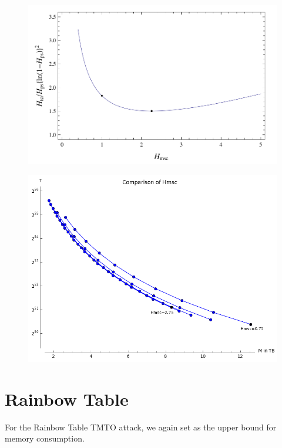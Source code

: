 \begin{figure}[H]
  \centering
  \begin{minipage}{0.45\textwidth}
    \centering
    \includegraphics[width=1.2\textwidth]{figures/HellmanTradeOff.png}
    \label{fig:dpTC}
  \end{minipage}\hfill
  \begin{minipage}{0.45\textwidth}
    \centering
    \includegraphics[width=1.2\textwidth]{figures/compareHmsc.png}
    \label{fig:dpHmsc}
  \end{minipage}
\end{figure}

\section{Rainbow Table}
\label{sec:rainbowparam}
For the Rainbow Table TMTO attack, we again set  as the
upper bound for memory consumption.

